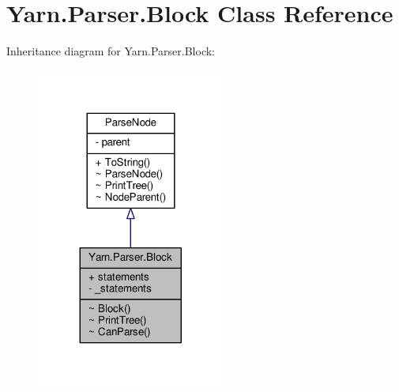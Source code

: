 \hypertarget{a00022}{\section{Yarn.\-Parser.\-Block Class Reference}
\label{a00022}
}


Inheritance diagram for Yarn.\-Parser.\-Block\-:
\nopagebreak
\begin{figure}[H]
\begin{center}
\leavevmode
\includegraphics[width=176pt]{dc/d6a/a00261}
\end{center}
\end{figure}


